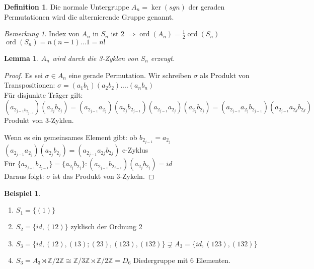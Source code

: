 \documentclass[12pt]{scrartcl}%
\newtheorem{lemma}{Lemma}
\theoremstyle{definition}
\newtheorem*{defn}{Definition}
\newtheorem{ex}{Beispiel}
\theoremstyle{remark}
\newtheorem*{nb}{Bemerkung}
\DeclareMathOperator\ord{ord}
\begin{document}
	\begin{defn}
	Die normale Untergruppe $A_n=\ker(sgn)$ der geraden Permutationen wird die alternierende Gruppe genannt.
	\end{defn}
	
	\begin{nb}
	Index von $A_n$ in $S_n$ ist 2 $\Rightarrow \ord(A_n)=\frac{1}{2}\ord(S_n)$\\
	$\ord(S_n)=n(n-1)...1=n!$
	\end{nb}
	
	\begin{lemma}
	$A_n$ wird durch die 3-Zyklen von $S_n$ erzeugt.
	\end{lemma}
	
	\begin{proof}
	Es sei $\sigma \in A_n$ eine gerade Permutation. Wir schreiben $\sigma$ als Produkt von Transpositionen:
	$\sigma =(a_1b_1)(a_2b_2)....(a_nb_n)$\\
	Für disjunkte Träger gilt:\\
	$(a_{2_{j-1}b_{2_{j-1}}})(a_{2_j}b_{2_j})=(a_{2_{j-1}}a_{2_j})(a_{2_j}b_{2_{j-1}})(a_{2_{j-1}}a_{2_j})(a_{2_j}b_{2_j})=(a_{2_{j-1}}a_{2_j}b_{2_{j-1}})(a_{2_{j-1}}a_{2j}b_{2j})$\\
	Produkt von 3-Zyklen.
	
	Wenn es ein gemeinsames Element gibt: ob $b_{2_{j-1}}=a_{2_j}$\\
	$(a_{2_{j-1}}a_{2_j})(a_{2_j}b_{2_j})=(a_{2_{j-1}}a_{2j}b_{2j})$ e-Zyklus\\
	Für $\{ a_{2_{j-1}}b_{2_{j-1}}\} =\{ a_{2_j}b_{2_j} \} : (a_{2_{j-1}}b_{2_{j-1}})(a_{2_j}b_{2_j})=id$\\
	Daraus folgt: $\sigma$ ist das Produkt von 3-Zykeln.
	\end{proof}
	
	\begin{ex}
	\begin{enumerate}
		\item $S_1=\{ (1)\}$
		\item $S_2=\{ id, (12)\}$ zyklisch der Ordnung 2
		\item $S_3=\{ id,(12),(13);(23),(123),(132)\} \supsetneq A_3=\{ id,(123),(132)\}$
		\item $S_3=A_3\rtimes \mathbb{Z}/2\mathbb{Z} \cong  \mathbb{Z}/3\mathbb{Z} \rtimes \mathbb{Z}/2\mathbb{Z} = D_6$ Diedergruppe mit 6 Elementen.
	\end{enumerate}
	\end{ex}
	 
\end{document}
